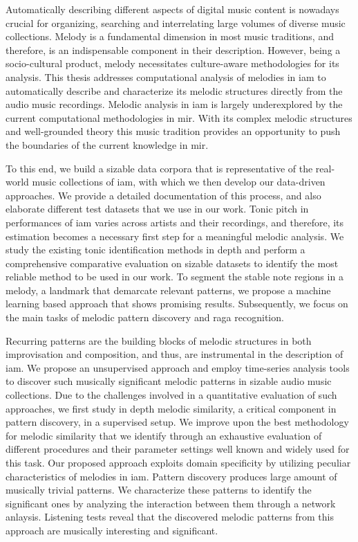 
Automatically describing different aspects of digital music content is nowadays crucial for organizing, searching and interrelating large volumes of diverse music collections. Melody is a fundamental dimension in most music traditions, and therefore, is an indispensable component in their description. However, being a socio-cultural product, melody necessitates culture-aware methodologies for its analysis. This thesis addresses computational analysis of melodies in \gls{iam} to automatically describe and characterize its melodic structures directly from the audio music recordings. Melodic analysis in \gls{iam} is largely underexplored by the current computational methodologies in \gls{mir}. With its complex melodic structures and well-grounded theory this music tradition provides an opportunity to push the boundaries of the current knowledge in \gls{mir}. 

To this end, we build a sizable data corpora that is representative of the real-world music collections of \gls{iam}, with which we then develop our data-driven approaches. We provide a detailed documentation of this process, and also elaborate different test datasets that we use in our work. Tonic pitch in performances of \gls{iam} varies across artists and their recordings, and therefore, its estimation becomes a necessary first step for a meaningful melodic analysis.  We study the existing tonic identification methods in depth and perform a comprehensive comparative evaluation on sizable datasets to identify the most reliable method to be used in our work. To segment the stable note regions in a melody, a landmark that demarcate relevant patterns, we propose a machine learning based approach that shows promising results. Subsequently, we focus on the main tasks of melodic pattern discovery and raga recognition. 

Recurring patterns are the building blocks of melodic structures in both improvisation and composition, and thus, are instrumental in the description of \gls{iam}. We propose an unsupervised approach and employ time-series analysis tools to discover such musically significant melodic patterns in sizable audio music collections. Due to the challenges involved in a quantitative evaluation of such approaches, we first study in depth melodic similarity, a critical component in pattern discovery, in a supervised setup. We improve upon the best methodology for melodic similarity that we identify through an exhaustive evaluation of different procedures and their parameter settings well known and widely used for this task. Our proposed approach exploits domain specificity by utilizing peculiar characteristics of melodies in \gls{iam}. Pattern discovery produces large amount of musically trivial patterns. We characterize these patterns to identify the significant ones by analyzing the interaction between them through a network anlaysis. Listening tests reveal that the discovered melodic patterns from this approach are musically interesting and significant.

